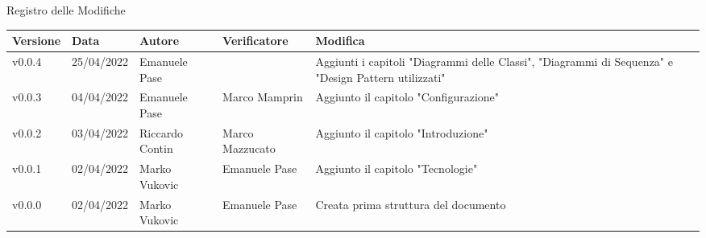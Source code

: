 \begin{center}
  \huge{Registro delle Modifiche}
\end{center}
\renewcommand\arraystretch{1,5}
{\centering
\begin{longtable}{|C{1.8cm}|C{2.1cm}|C{2cm}|C{2.4cm}|L{4.4cm}|}
  \hline
  \textcolor[HTML]{FFFFFF}{\textbf{Versione}} & \textcolor[HTML]{FFFFFF}{\textbf{Data}} & \textcolor[HTML]{FFFFFF}{\textbf{Autore}}  & \textcolor[HTML]{FFFFFF}{\textbf{Verificatore}} & \textcolor[HTML]{FFFFFF}{\textbf{Modifica}}    \\ \hline
  v0.0.4        & 25/04/2022    & Emanuele Pase   &                & Aggiunti i capitoli "Diagrammi delle Classi", "Diagrammi di Sequenza" e "Design Pattern utilizzati" \\ \hline
  v0.0.3        & 04/04/2022    & Emanuele Pase   &  Marco Mamprin  & Aggiunto il capitolo "Configurazione" \\ \hline
  v0.0.2        & 03/04/2022    & Riccardo Contin   &   Marco Mazzucato   & Aggiunto il capitolo "Introduzione" \\ \hline
  v0.0.1        & 02/04/2022    & Marko Vukovic   & Emanuele Pase         & Aggiunto il capitolo "Tecnologie" \\ \hline
  v0.0.0        & 02/04/2022    & Marko Vukovic   & Emanuele Pase         & Creata prima struttura del documento \\ \hline
\end{longtable}}

\renewcommand\arraystretch{1}
